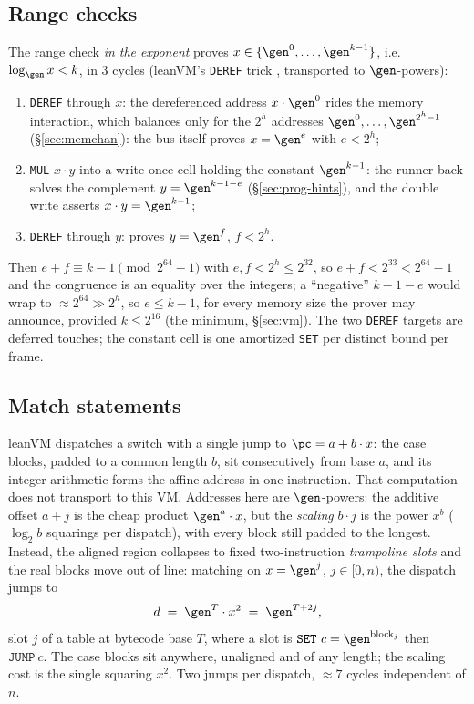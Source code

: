 \subsection{Range checks}\label{sec:prog-range-checks}

The range check \emph{in the exponent} proves $x\in\{\gen^{0},\dots,\gen^{k-1}\}$, i.e.\ $\log_{\gen}x<k$, in 3 cycles (leanVM's \texttt{DEREF} trick \cite{leanVM}, transported to $\gen$-powers):
\begin{enumerate}
\item \texttt{DEREF} through $x$: the dereferenced address $x\cdot\gen^{0}$ rides the memory interaction, which balances only for the $2^{h}$ addresses $\gen^{0},\dots,\gen^{2^{h}-1}$ (\S\ref{sec:memchan}): the bus itself proves $x=\gen^{e}$ with $e<2^{h}$;
\item \texttt{MUL} $x\cdot y$ into a write-once cell holding the constant $\gen^{k-1}$: the runner back-solves the complement $y=\gen^{k-1-e}$ (\S\ref{sec:prog-hints}), and the double write asserts $x\cdot y=\gen^{k-1}$;
\item \texttt{DEREF} through $y$: proves $y=\gen^{f}$, $f<2^{h}$.
\end{enumerate}
Then $e+f\equiv k-1\pmod{2^{64}-1}$ with $e,f<2^{h}\le2^{32}$, so $e+f<2^{33}<2^{64}-1$ and the congruence is an equality over the integers; a ``negative'' $k-1-e$ would wrap to $\approx2^{64}\gg2^{h}$, so $e\le k-1$, for every memory size the prover may announce, provided $k\le2^{16}$ (the minimum, \S\ref{sec:vm}). The two \texttt{DEREF} targets are deferred touches; the constant cell is one amortized \texttt{SET} per distinct bound per frame.

\subsection{Match statements}\label{sec:prog-match}

leanVM dispatches a switch with a single jump to $\pc=a+b\cdot x$: the case blocks, padded to a common length $b$, sit consecutively from base $a$, and its integer arithmetic forms the affine address in one instruction. That computation does not transport to this VM. Addresses here are $\gen$-powers: the additive offset $a+j$ is the cheap product $\gen^{a}\cdot x$, but the \emph{scaling} $b\cdot j$ is the power $x^{b}$ ($\log_2 b$ squarings per dispatch), with every block still padded to the longest. Instead, the aligned region collapses to fixed two-instruction \emph{trampoline slots} and the real blocks move out of line: matching on $x=\gen^{j}$, $j\in[0,n)$, the dispatch jumps to
\[
  d \;=\; \gen^{T}\cdot x^{2} \;=\; \gen^{T+2j},
\]
slot $j$ of a table at bytecode base $T$, where a slot is $\texttt{SET}\ c=\gen^{\mathrm{block}_j}$ then $\texttt{JUMP}\ c$. The case blocks sit anywhere, unaligned and of any length; the scaling cost is the single squaring $x^{2}$. Two jumps per dispatch, $\approx7$ cycles independent of $n$.

